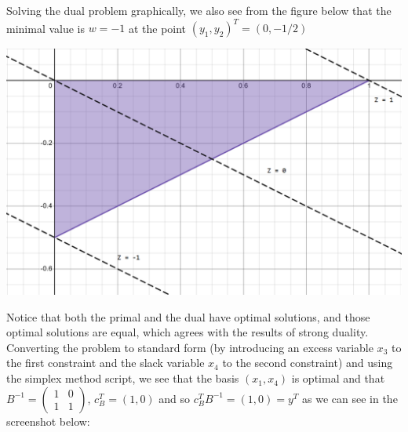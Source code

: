 \documentclass{article}
\begin{document}
Solving the dual problem graphically, we also see from the figure below that the minimal value is $w = -1$ at the point $(y_1,y_2)^T = (0,-1/2)$
\begin{center}
    \includegraphics[scale = 0.5]{2.1dual}
\end{center}
Notice that both the primal and the dual have optimal solutions, and those optimal solutions are equal, which agrees with the results of strong duality. Converting the problem to standard form (by introducing an excess variable $x_3$ to the first constraint and the slack variable $x_4$ to the second constraint) and using the simplex method script, we see that the basis $(x_1,x_4)$ is optimal and that $B^{-1} = \begin{pmatrix}
    1 & 0\\
    1 & 1
\end{pmatrix}$, $c_B^T = (1,0)$ and so $c_B^TB^{-1} = (1,0) = y^T$ as we can see in the screenshot below:
\end{document}

